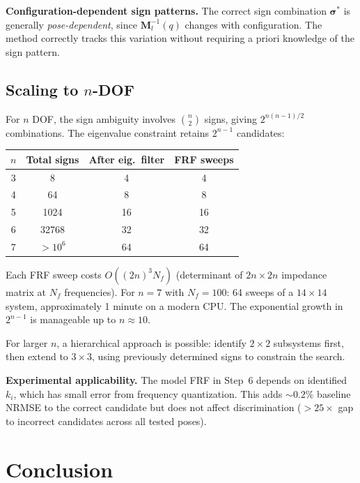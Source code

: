 \documentclass[10pt,twocolumn]{article}
\begin{document}
\textbf{Configuration-dependent sign patterns.} The correct sign combination $\bm{\sigma}^*$ is generally \emph{pose-dependent}, since $\bm{M}_l^{-1}(q)$ changes with configuration. The method correctly tracks this variation without requiring a priori knowledge of the sign pattern.

\subsection{Scaling to $n$-DOF}

For $n$ DOF, the sign ambiguity involves $\binom{n}{2}$ signs, giving $2^{n(n-1)/2}$ combinations. The eigenvalue constraint retains $2^{n-1}$ candidates:
\begin{center}
\begin{tabular}{cccc}
\toprule
$n$ & Total signs & After eig.\ filter & FRF sweeps \\
\midrule
3 & 8 & 4 & 4 \\
4 & 64 & 8 & 8 \\
5 & 1024 & 16 & 16 \\
6 & 32768 & 32 & 32 \\
7 & $>10^6$ & 64 & 64 \\
\bottomrule
\end{tabular}
\end{center}

Each FRF sweep costs $O((2n)^3 N_f)$ (determinant of $2n \times 2n$ impedance matrix at $N_f$ frequencies). For $n=7$ with $N_f=100$: 64 sweeps of a $14\times 14$ system, approximately 1 minute on a modern CPU. The exponential growth in $2^{n-1}$ is manageable up to $n \approx 10$.

For larger $n$, a hierarchical approach is possible: identify $2\times 2$ subsystems first, then extend to $3\times 3$, using previously determined signs to constrain the search.

\textbf{Experimental applicability.} The model FRF in Step~6 depends on identified $k_i$, which has small error from frequency quantization. This adds ${\sim}0.2\%$ baseline NRMSE to the correct candidate but does not affect discrimination ($>25\times$ gap to incorrect candidates across all tested poses).

\section{Conclusion}
\end{document}
